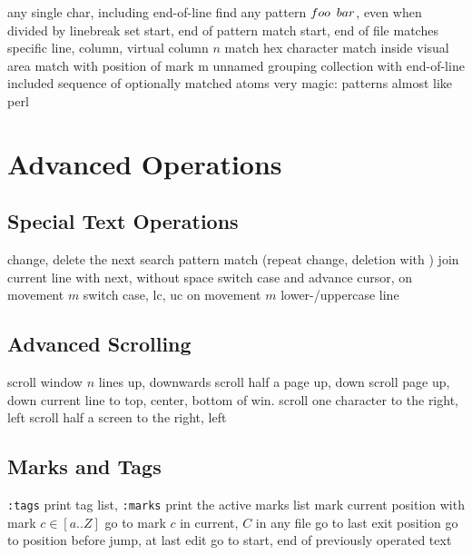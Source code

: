 	{any single char, including end-of-line}
	{find any pattern $foo\enskip bar$, even when divided by linebreak}
	{set start, end of pattern}
\cmdOper{\bs \%\^{} \bs\%\$ }	{match start, end of file}
	{matches specific line, column, virtual column $n$}
	{match hex character}
	{match inside visual area}
	{match with position of mark m}
\cmdOper{\bs\%(\bs) }	{unnamed grouping}
\cmdOper{\bs\_$[$ $]$ }	{collection with end-of-line included}
\cmdOper{\bs\%$[$ $]$ }	{sequence of optionally matched atoms}
	{very magic: patterns almost like perl}

\section{Advanced Operations}{}
\subsection{Special Text Operations}{}
	{change, delete the next search pattern match (repeat change, deletion with )}
	{join current line with next, without space}
	{switch case and advance cursor, on movement $m$ }
	{switch case, lc, uc on movement $m$}
	{lower-/uppercase line}

\subsection{Advanced Scrolling}	{}
	{scroll window $n$ lines up, downwards}
	{scroll half a page up, down}
	{scroll page up, down}
	{current line to top, center, bottom of win.}
	{scroll one character to the right, left}
	{scroll half a screen to the right, left}

\subsection{Marks and Tags}	{{\tt :tags} print tag list, {\tt :marks} print the active marks list}
	{mark current position with mark $c\in[a..Z]$}
	{go to mark $c$ in current, $C$ in any file}
	{go to last exit position}
	{go to position before jump, at last edit}
	{go to start, end of previously operated text}

